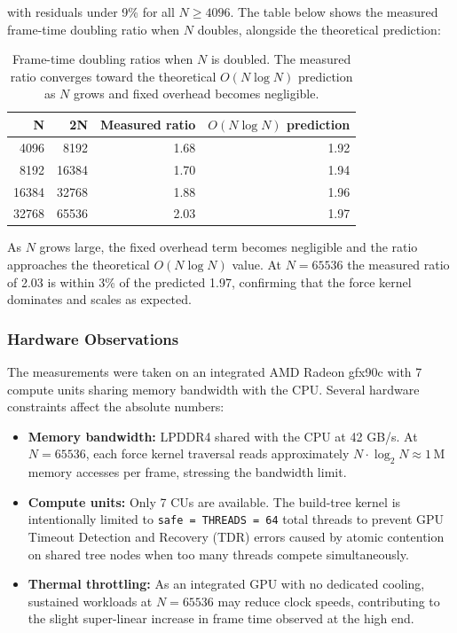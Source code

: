\documentclass[12pt]{article}
\begin{document}
with residuals under 9\% for all $N \geq 4096$. The table below shows
the measured frame-time doubling ratio when $N$ doubles, alongside the
theoretical prediction:

\begin{table}[h]
\centering
\begin{tabular}{|r|r|r|r|}
\hline
\textbf{N} & \textbf{2N} & \textbf{Measured ratio} & \textbf{$O(N \log N)$ prediction} \\
\hline
4096  & 8192  & 1.68 & 1.92 \\
8192  & 16384 & 1.70 & 1.94 \\
16384 & 32768 & 1.88 & 1.96 \\
32768 & 65536 & 2.03 & 1.97 \\
\hline
\end{tabular}
\caption{Frame-time doubling ratios when $N$ is doubled. The measured ratio
         converges toward the theoretical $O(N \log N)$ prediction as $N$
         grows and fixed overhead becomes negligible.}
\end{table}

As $N$ grows large, the fixed overhead term becomes negligible and the ratio
approaches the theoretical $O(N \log N)$ value. At $N = 65536$ the measured
ratio of 2.03 is within 3\% of the predicted 1.97, confirming that the
force kernel dominates and scales as expected.

\subsubsection{Hardware Observations}

The measurements were taken on an integrated AMD Radeon gfx90c with
7 compute units sharing memory bandwidth with the CPU. Several hardware
constraints affect the absolute numbers:

\begin{itemize}
    \item \textbf{Memory bandwidth:} LPDDR4 shared with the CPU at 42 GB/s.
          At $N = 65536$, each force kernel traversal reads approximately
          $N \cdot \log_2 N \approx 1\,\text{M}$ memory accesses per frame,
          stressing the bandwidth limit.
    \item \textbf{Compute units:} Only 7 CUs are available. The build-tree
          kernel is intentionally limited to \texttt{safe = THREADS = 64}
          total threads to prevent GPU Timeout Detection and Recovery (TDR)
          errors caused by atomic contention on shared tree nodes when too
          many threads compete simultaneously.
    \item \textbf{Thermal throttling:} As an integrated GPU with no dedicated
          cooling, sustained workloads at $N = 65536$ may reduce clock speeds,
          contributing to the slight super-linear increase in frame time
          observed at the high end.
\end{itemize}
\end{document}
